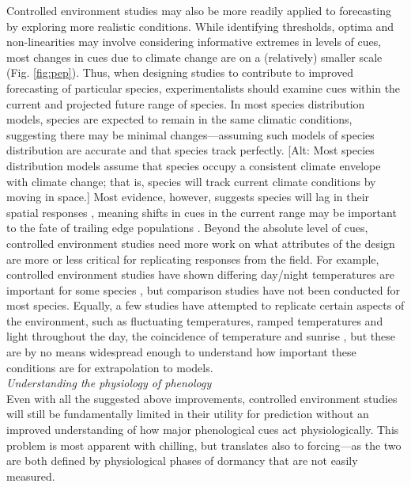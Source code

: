 \documentclass[11pt,letter]{article}
\begin{document}
Controlled environment studies may also be more readily applied to forecasting by exploring more realistic conditions. While identifying thresholds, optima and non-linearities may involve considering informative extremes in levels of cues, most changes in cues due to climate change are on a (relatively) smaller scale (Fig. \ref{fig:pep}). Thus, when designing studies to contribute to improved forecasting of particular species, experimentalists should examine cues within the current and projected future range of species. In most species distribution models, species are expected to remain in the same climatic conditions, suggesting there may be minimal changes---assuming such models of species distribution are accurate and that species track perfectly. [Alt: Most species distribution models assume that species occupy a consistent climate envelope with climate change; that is, species will track current climate conditions by moving in space.] Most evidence, however, suggests species will lag in their spatial responses \citep{Loarie:2009ax}, meaning shifts in cues in the current range may be important to the fate of trailing edge populations \citep{bertrand2011changes,lenoir2015climate,savage2015elevational}. Beyond the absolute level of cues, controlled environment studies need more work on what attributes of the design are more or less critical for replicating responses from the field. For example, controlled environment studies have shown differing day/night temperatures are important for some species \citep{heuvelink1989influence,abrol1996effects,Thingnaes2003,pressman2006exposing}, but comparison studies have not been conducted for most species. Equally, a few studies have attempted to replicate certain aspects of the environment, such as fluctuating temperatures, ramped temperatures and light throughout the day, the coincidence of temperature and sunrise \citep{erwin1998}, but these are by no means widespread enough to understand how important these conditions are for extrapolation to models. \\

\emph{Understanding the physiology of phenology}\\
Even with all the suggested above improvements, controlled environment studies will still be fundamentally limited in their utility for prediction without an improved understanding of how major phenological cues act physiologically. This problem is most apparent with chilling, but translates also to forcing---as the two are both defined by physiological phases of dormancy that are not easily measured. \\
\end{document}
